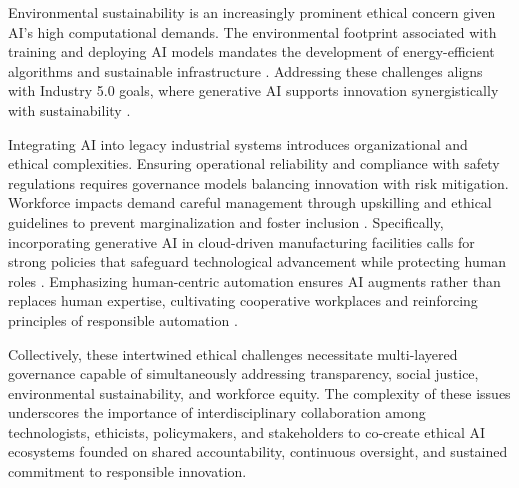 \documentclass[sigconf]{acmart}
\begin{document}
Environmental sustainability is an increasingly prominent ethical concern given AI's high computational demands. The environmental footprint associated with training and deploying AI models mandates the development of energy-efficient algorithms and sustainable infrastructure \cite{ref19}. Addressing these challenges aligns with Industry 5.0 goals, where generative AI supports innovation synergistically with sustainability \cite{ref6}.

Integrating AI into legacy industrial systems introduces organizational and ethical complexities. Ensuring operational reliability and compliance with safety regulations requires governance models balancing innovation with risk mitigation. Workforce impacts demand careful management through upskilling and ethical guidelines to prevent marginalization and foster inclusion \cite{ref11,ref12,ref38}. Specifically, incorporating generative AI in cloud-driven manufacturing facilities calls for strong policies that safeguard technological advancement while protecting human roles \cite{ref11,ref12}. Emphasizing human-centric automation ensures AI augments rather than replaces human expertise, cultivating cooperative workplaces and reinforcing principles of responsible automation \cite{ref2}.

Collectively, these intertwined ethical challenges necessitate multi-layered governance capable of simultaneously addressing transparency, social justice, environmental sustainability, and workforce equity. The complexity of these issues underscores the importance of interdisciplinary collaboration among technologists, ethicists, policymakers, and stakeholders to co-create ethical AI ecosystems founded on shared accountability, continuous oversight, and sustained commitment to responsible innovation.
\end{document}
